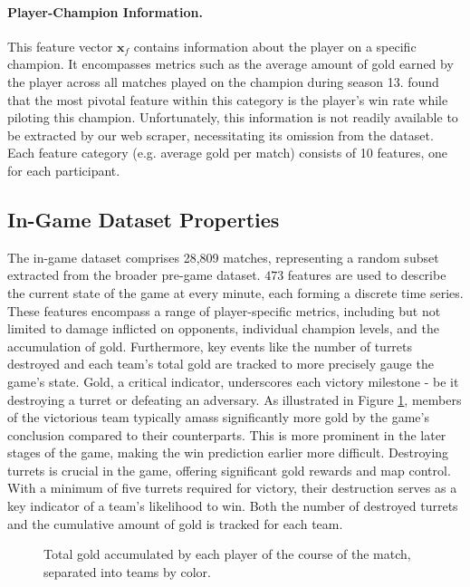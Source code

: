 \documentclass[12pt, a4paper, headinclude, twoside, plainheadsepline, open=right, numbers=noenddot, hidelinks, toc=listof, toc=bibliography]{scrreprt}
\begin{document}
\paragraph{Player-Champion Information.}
This feature vector $\mathbf{x}_f$ contains information about the player on a specific champion.
It encompasses metrics such as the average amount of gold earned by the player across all matches played on the champion during season 13. 
 \cite{costaFeatureAnalysisLeague2021} found that  the most pivotal feature within this category is the player's win rate while piloting this champion.
Unfortunately, this information is not readily available to be extracted by our web scraper,  necessitating its omission from the dataset.
Each feature category (e.g.  average gold per match) consists of 10 features, one for each participant.

\subsection{In-Game Dataset Properties}
\label{ssec:in_game_data}

The in-game dataset comprises 28,809 matches, representing a random subset extracted from the broader pre-game dataset.
$473$ features are used to describe the current state of the game at every minute, each forming a discrete time series.
These features encompass a range of player-specific metrics, including but not limited to damage inflicted on opponents, individual champion levels, and the accumulation of gold.
Furthermore, key events like the number of turrets destroyed and each team's total gold are tracked to more precisely gauge the game's state. 
Gold, a critical indicator, underscores each victory milestone - be it destroying a turret or defeating an adversary. 
As illustrated in Figure \ref{fig:totalGold}, members of the victorious team typically amass significantly more gold by the game's conclusion compared to their counterparts.
This is more prominent in the later stages of the game, making the win prediction earlier more difficult.
Destroying turrets is crucial in the game, offering significant gold rewards and map control. 
With a minimum of five turrets required for victory, their destruction serves as a key indicator of a team's likelihood to win.
Both the number of destroyed turrets and the cumulative amount of gold is tracked for each team.

\begin{figure}

\caption{Total gold accumulated by each player of the course of the match, separated into teams by color. }
\label{fig:totalGold}
\end{figure}
\end{document}
